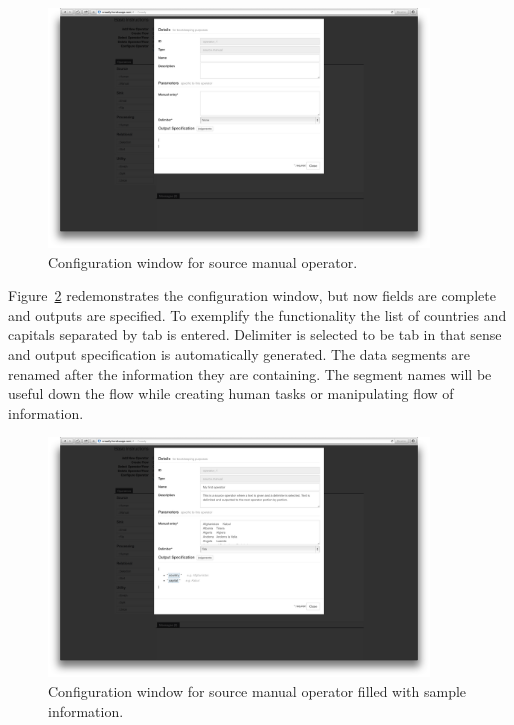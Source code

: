\begin{figure}[ht]
	\centering
	\includegraphics[width=0.9\textwidth]{figures/tool/panel3.png}
	\caption{Configuration window for source manual operator.}
	\label{fig:panel3}
\end{figure}

Figure~\ref{fig:panel4} redemonstrates the configuration window, but 
now fields are complete and outputs are specified. To exemplify the functionality 
the list of countries and capitals separated by tab is entered. Delimiter is selected 
to be tab in that sense and output specification is automatically generated. The 
data segments are renamed after the information they are containing. The 
segment names will be useful down the flow while creating human tasks or 
manipulating flow of information.

\begin{figure}[ht]
	\centering
	\includegraphics[width=0.9\textwidth]{figures/tool/panel4.png}
	\caption{Configuration window for source manual operator filled with sample information.}
	\label{fig:panel4}
\end{figure}

